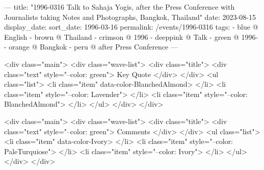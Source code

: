 ---
title: "1996-0316 Talk to Sahaja Yogis, after the Press Conference with Journalists taking Notes and Photographs, Bangkok, Thailand"
date: 2023-08-15
display_date: 
sort_date: 1996-03-16
permalink: /events/1996-0316
tags:
  - blue @ English
  - brown @ Thailand
  - crimson @ 1996
  - deeppink @ Talk
  - green @ 1996-
  - orange @ Bangkok
  - peru @ after Press Conference
---

<div class="main">
  <div class="wave-list">
    <div class="title">
      <div class="text" style="--color: green">
        Key Quote
      </div>
    </div>
    <ul class="list">
        <li class="item" data-color-BlanchedAlmond>
        </li>
        <li class="item" style="--color: Lavender">
        </li>
        <li class="item" style="--color: BlanchedAlmond">
        </li>
      </ul>
  </div>
</div>

<div class="main">
  <div class="wave-list">
    <div class="title">
      <div class="text" style="--color: green">
        Comments
      </div>
    </div>
    <ul class="list">
        <li class="item" data-color-Ivory>
        </li>
        <li class="item" style="--color: PaleTurquiose">
        </li>
        <li class="item" style="--color: Ivory">
        </li>
      </ul>
  </div>
</div>